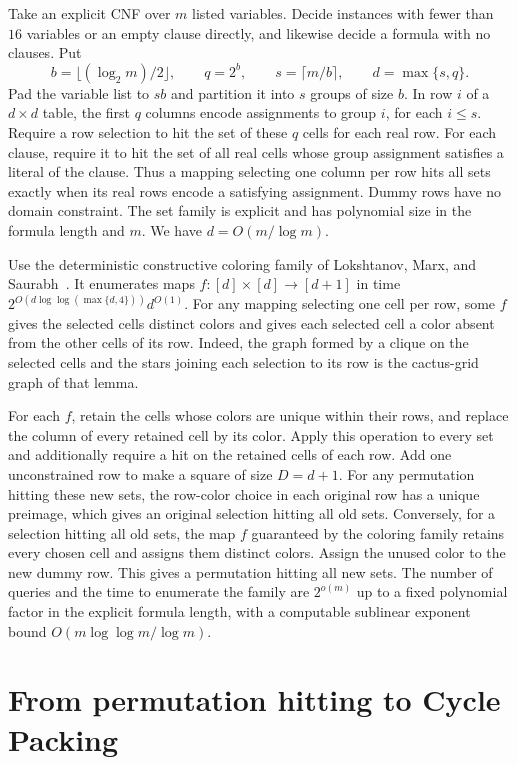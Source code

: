 \documentclass[11pt]{article}
\begin{document}
Take an explicit CNF over \(m\) listed variables. Decide instances with fewer
than \(16\) variables or an empty clause directly, and likewise decide a
formula with no clauses. Put
\[
 b=\lfloor (\log_2 m)/2\rfloor,\qquad
 q=2^b,\qquad s=\lceil m/b\rceil,\qquad d=\max\{s,q\}.
\]
Pad the variable list to \(sb\) and partition it into \(s\) groups of size
\(b\). In row \(i\) of a \(d\times d\) table, the first \(q\) columns encode
assignments to group \(i\), for each \(i\le s\). Require a row selection to
hit the set of these \(q\) cells for each real row. For each clause, require
it to hit the set of all real cells whose group assignment satisfies a
literal of the clause. Thus a mapping selecting one column per row hits all
sets exactly when its real rows encode a satisfying assignment. Dummy
rows have no domain constraint. The set family is explicit and has polynomial
size in the formula length and \(m\). We have \(d=O(m/\log m)\).

Use the deterministic constructive coloring family of Lokshtanov, Marx, and
Saurabh~\cite[Lemma 2.8 and its proof]{lms}. It enumerates maps
\(f\colon[d]\times[d]\to[d+1]\) in time
\(2^{O(d\log\log(\max\{d,4\}))}d^{O(1)}\). For any mapping selecting one cell
per row, some \(f\) gives the selected cells distinct colors and gives each
selected cell a color absent from the other cells of its row. Indeed, the
graph formed by a clique on the selected cells and the stars joining each
selection to its row is the cactus-grid graph of that lemma.

For each \(f\), retain the cells whose colors are unique within their rows, and
replace the column of every retained cell by its color. Apply this operation to
every set and additionally require a hit on the retained cells of each row.
Add one unconstrained row to make a square of size \(D=d+1\).
For any permutation hitting these new sets, the row-color choice in each
original row has a unique preimage, which gives an original selection hitting
all old sets. Conversely, for a selection hitting all old sets, the map
\(f\) guaranteed by the coloring family retains every chosen cell and assigns
them distinct colors. Assign the unused color to the new dummy row. This
gives a permutation hitting all new sets. The number of queries and the time
to enumerate the family are \(2^{o(m)}\) up to a fixed polynomial factor in
the explicit formula length, with a computable sublinear exponent bound
\(O(m\log\log m/\log m)\).


\section{From permutation hitting to Cycle Packing}
\end{document}
